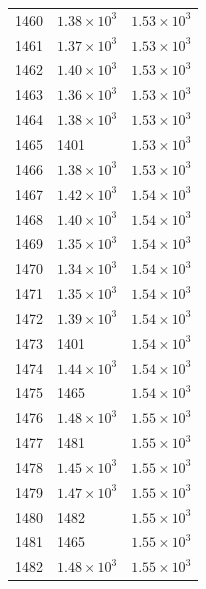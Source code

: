 \begin{table}[H]
\begin{tabular}{lll}
1460 & $\displaystyle 1.38 \times 10^{3}$ & $\displaystyle 1.53 \times 10^{3}$ \\
1461 & $\displaystyle 1.37 \times 10^{3}$ & $\displaystyle 1.53 \times 10^{3}$ \\
1462 & $\displaystyle 1.40 \times 10^{3}$ & $\displaystyle 1.53 \times 10^{3}$ \\
1463 & $\displaystyle 1.36 \times 10^{3}$ & $\displaystyle 1.53 \times 10^{3}$ \\
1464 & $\displaystyle 1.38 \times 10^{3}$ & $\displaystyle 1.53 \times 10^{3}$ \\
1465 & 1401 & $\displaystyle 1.53 \times 10^{3}$ \\
1466 & $\displaystyle 1.38 \times 10^{3}$ & $\displaystyle 1.53 \times 10^{3}$ \\
1467 & $\displaystyle 1.42 \times 10^{3}$ & $\displaystyle 1.54 \times 10^{3}$ \\
1468 & $\displaystyle 1.40 \times 10^{3}$ & $\displaystyle 1.54 \times 10^{3}$ \\
1469 & $\displaystyle 1.35 \times 10^{3}$ & $\displaystyle 1.54 \times 10^{3}$ \\
1470 & $\displaystyle 1.34 \times 10^{3}$ & $\displaystyle 1.54 \times 10^{3}$ \\
1471 & $\displaystyle 1.35 \times 10^{3}$ & $\displaystyle 1.54 \times 10^{3}$ \\
1472 & $\displaystyle 1.39 \times 10^{3}$ & $\displaystyle 1.54 \times 10^{3}$ \\
1473 & 1401 & $\displaystyle 1.54 \times 10^{3}$ \\
1474 & $\displaystyle 1.44 \times 10^{3}$ & $\displaystyle 1.54 \times 10^{3}$ \\
1475 & 1465 & $\displaystyle 1.54 \times 10^{3}$ \\
1476 & $\displaystyle 1.48 \times 10^{3}$ & $\displaystyle 1.55 \times 10^{3}$ \\
1477 & 1481 & $\displaystyle 1.55 \times 10^{3}$ \\
1478 & $\displaystyle 1.45 \times 10^{3}$ & $\displaystyle 1.55 \times 10^{3}$ \\
1479 & $\displaystyle 1.47 \times 10^{3}$ & $\displaystyle 1.55 \times 10^{3}$ \\
1480 & 1482 & $\displaystyle 1.55 \times 10^{3}$ \\
1481 & 1465 & $\displaystyle 1.55 \times 10^{3}$ \\
1482 & $\displaystyle 1.48 \times 10^{3}$ & $\displaystyle 1.55 \times 10^{3}$ \\

\end{tabular}
\end{table}
